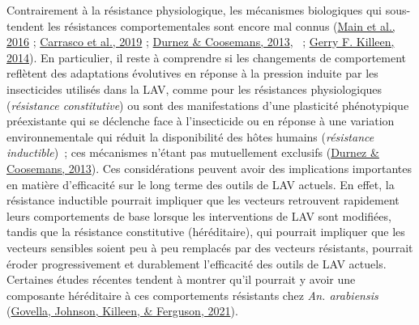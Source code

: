 \documentclass[12pt,twoside]{reedthesis}
\begin{document}
Contrairement à la résistance physiologique, les mécanismes biologiques qui sous-tendent les résistances comportementales sont encore mal connus (\protect\hyperlink{ref-main_genetic_2016}{Main et al., 2016} ; \protect\hyperlink{ref-carrasco_behavioural_2019}{Carrasco et al., 2019} ; \protect\hyperlink{ref-manguin_residual_2013}{Durnez \& Coosemans, 2013}, ~; \protect\hyperlink{ref-killeen_characterizing_2014}{Gerry F. Killeen, 2014}). En particulier, il reste à comprendre si les changements de comportement reflètent des adaptations évolutives en réponse à la pression induite par les insecticides utilisés dans la LAV, comme pour les résistances physiologiques (\emph{résistance constitutive}) ou sont des manifestations d'une plasticité phénotypique préexistante qui se déclenche face à l'insecticide ou en réponse à une variation environnementale qui réduit la disponibilité des hôtes humains (\emph{résistance inductible})~; ces mécanismes n'étant pas mutuellement exclusifs (\protect\hyperlink{ref-manguin_residual_2013}{Durnez \& Coosemans, 2013}). Ces considérations peuvent avoir des implications importantes en matière d'efficacité sur le long terme des outils de LAV actuels. En effet, la résistance inductible pourrait impliquer que les vecteurs retrouvent rapidement leurs comportements de base lorsque les interventions de LAV sont modifiées, tandis que la résistance constitutive (héréditaire), qui pourrait impliquer que les vecteurs sensibles soient peu à peu remplacés par des vecteurs résistants, pourrait éroder progressivement et durablement l'efficacité des outils de LAV actuels. Certaines études récentes tendent à montrer qu'il pourrait y avoir une composante héréditaire à ces comportements résistants chez \emph{An. arabiensis} (\protect\hyperlink{ref-govella_heritability_2021}{Govella, Johnson, Killeen, \& Ferguson, 2021}).\\
\end{document}
